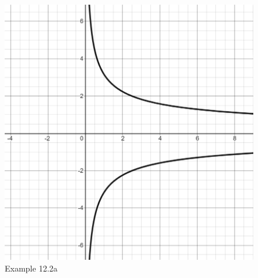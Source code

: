 \newpage
 \begin{figure}[h!]
 \centering
    \includegraphics[scale=0.45]{images/implicitDiff/implicit12_2a.PNG}
    \caption{Example 12.2a}
    \end{figure}
    
